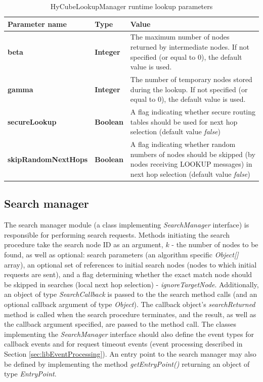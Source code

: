 \begin{table}
\scriptsize
\begin{center}
\begin{tabular}{p{3cm} p{3cm} p{8.5cm}}
	\hline
	\textbf{Parameter name}					& \textbf{Type}					& \textbf{Value}					\\[1mm]
    \hline
	\textbf{beta}							& \textbf{Integer}				& The maximum number of nodes returned by intermediate nodes. If not specified (or equal to 0), the default value is used.						\\[1.5mm]
	\textbf{gamma}							& \textbf{Integer}				& The number of temporary nodes stored during the lookup. If not specified (or equal to 0), the default value is used.							\\[1.5mm]
	\textbf{secureLookup}					& \textbf{Boolean}				& A flag indicating whether secure routing tables should be used for next hop selection (default value \emph{false})			\\[1.5mm]
	\textbf{skipRandomNextHops}				& \textbf{Boolean}				& A flag indicating whether random numbers of nodes should be skipped (by nodes receiving LOOKUP messages) in next hop selection (default value \emph{false})		\\[1.5mm]
    \hline
\end{tabular}
\end{center}
\caption{HyCubeLookupManager runtime lookup parameters}
\label{tab:libHyCubeLookupManagerLookupParameters}
\end{table}







\subsection{Search manager}
\label{sec:libSearchManager}

The search manager module (a class implementing \emph{SearchManager} interface) is responsible for performing search requests. Methods initiating the search procedure take the search node ID as an argument, $k$ - the number of nodes to be found, as well as optional: search parameters (an algorithm specific \emph{Object[]} array), an optional set of references to initial search nodes (nodes to which initial requests are sent), and a flag determining whether the exact match node should be skipped in searches (local next hop selection) - \emph{ignoreTargetNode}. Additionally, an object of type \emph{SearchCallback} is passed to the the search method calls (and an optional callback argument of type \emph{Object}). The callback object's \emph{searchReturned} method is called when the search procedure terminates, and the result, as well as the callback argument specified, are passed to the method call. The classes implementing the \emph{SearchManager} interface should also define the event types for callback events and for request timeout events (event processing described in Section \ref{sec:libEventProcessing}). An entry point to the search manager may also be defined by implementing the method \emph{getEntryPoint()} returning an object of type \emph{EntryPoint}.

